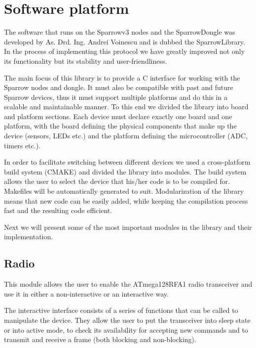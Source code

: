 
\chapter{Software platform}

The software that runs on the Sparrowv3 nodes and the SparrowDongle was
developed by As. Drd. Ing. Andrei Voinescu and is dubbed  the SparrowLibrary.
In the process of implementing this protocol we have greatly improved not only
its functionality but its stability and user-friendliness.

The main focus of this library is to provide a C interface for working with the
Sparrow nodes and dongle. It must also be compatible with past and future
Sparrow devices, thus it must support multiple platforms and do this in a
scalable and maintainable manner. To this end we divided the library into board and platform
sections.  Each device must declare exactly one board and one platform, with
the board defining the physical components that make up the device (sensors,
LEDs etc.) and the platform defining the microcontroller (ADC, timers etc.). 

In order to facilitate switching between different devices we used a
cross-platform build system (CMAKE) and divided the library into modules. The
build system allows the user to select the device that his/her code is to be
compiled for. Makefiles will be automatically generated to suit. Modularization of the library means that new code can be easily added, while keeping the compilation process fast and the resulting code
efficient.

Next we will present some of the most important modules in the library and their
implementation.

\section{Radio}

This module allows the user to enable the ATmega128RFA1 radio transceiver and
use it in either a non-interactive or an interactive way. 

The interactive interface consists of a series of functions that can be called
to manipulate the device. They allow the user to put the transceiver into 
sleep state or into active mode, to check its availability for accepting new
commands and to transmit and receive a frame (both blocking and non-blocking).

